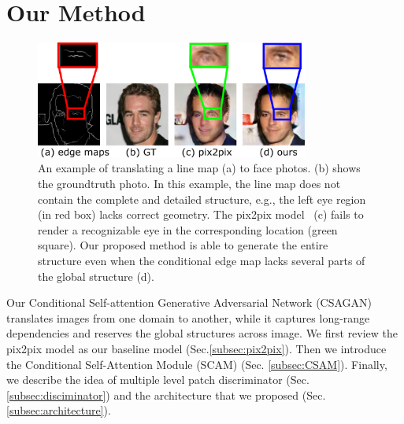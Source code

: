 \section{Our Method}
\label{sec:method}

%
\begin{figure}
	\includegraphics[width=0.8\textwidth]{figures/example}
	\caption{An example of translating a line map (a) to face photos. (b) shows the groundtruth photo. In this example, the line map does not contain the complete and detailed structure, e.g., the left eye region (in red box) lacks correct geometry. The pix2pix model~\cite{pix2pix} (c) fails to render a recognizable eye in the corresponding location (green square). Our proposed method is able to generate the entire structure even when the conditional edge map lacks several parts of the global structure (d).}
	\label{fig:example}
\end{figure}
%
Our Conditional Self-attention Generative Adversarial Network (CSAGAN) translates images from one domain to another, while it captures long-range dependencies and reserves
the global structures across image. We first review the pix2pix model as our baseline model (Sec.\ref{subsec:pix2pix}). 
Then we introduce the Conditional Self-Attention Module (SCAM) (Sec. \ref{subsec:CSAM}). Finally, we describe the idea of multiple level patch discriminator (Sec.\ref{subsec:disciminator}) and the architecture that we proposed (Sec. \ref{subsec:architecture}).



